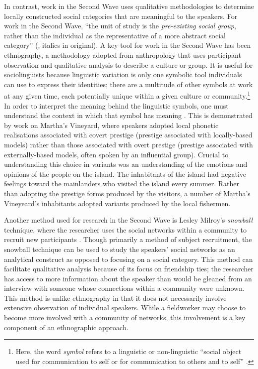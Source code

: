 In contrast, work in the Second Wave uses qualitative methodologies to determine locally constructed social categories that are meaningful to the speakers. For work in the Second Wave,	``the unit of study is the \textit{pre-existing social group}, rather than the individual as the representative of a more abstract social category'' (\cite[35]{milroy1987}, italics in original). A key tool for work in the Second Wave has been ethnography, a methodology adopted from anthropology that uses participant observation and qualitative analysis to describe a culture or group. It is useful for sociolinguists because linguistic variation is only one symbolic tool individuals can use to express their identities; there are a multitude of other symbols at work at any given time, each potentially unique within a given culture or community.\footnote{Here, the word \textit{symbol} refers to a linguistic or non-linguistic ``social object used for communication to self or for communication to others and to self'' \citep[42]{charon1995}.} In order to interpret the meaning behind the linguistic symbols, one must understand the context in which that symbol has meaning \citep[22]{savilletroike1982}. This is demonstrated by  work on Martha's Vineyard, where speakers adopted local phonetic realisations associated with covert prestige (prestige associated with locally-based models) rather than those associated with overt prestige (prestige associated with externally-based models, often spoken by an influential group). Crucial to understanding this choice in variants was an understanding of the emotions and opinions of the people on the island. The inhabitants of the island had negative feelings toward the mainlanders who visited the island every summer. Rather than adopting the prestige forms produced by the visitors, a number of Martha's Vineyeard's inhabitants adopted variants produced by the local fishermen. 

Another method used for research in the Second Wave is Lesley Milroy's \textit{snowball} technique, where the researcher uses the social networks within a community to recruit new participants \citep[32]{milroygordon2003}. Though primarily a method of subject recruitment, the snowball technique can be used to study the speakers' social networks as an analytical construct as opposed to focusing on a social category. This method can facilitate qualitative analysis because of its focus on friendship ties; the researcher has access to more information about the speaker than would be gleaned from an interview with someone whose connections within a community were unknown. This method is unlike ethnography in that it does not necessarily involve extensive observation of individual speakers. While a fieldworker may choose to become more involved with a community of networks, this involvement is a key component of an ethnographic approach. 

